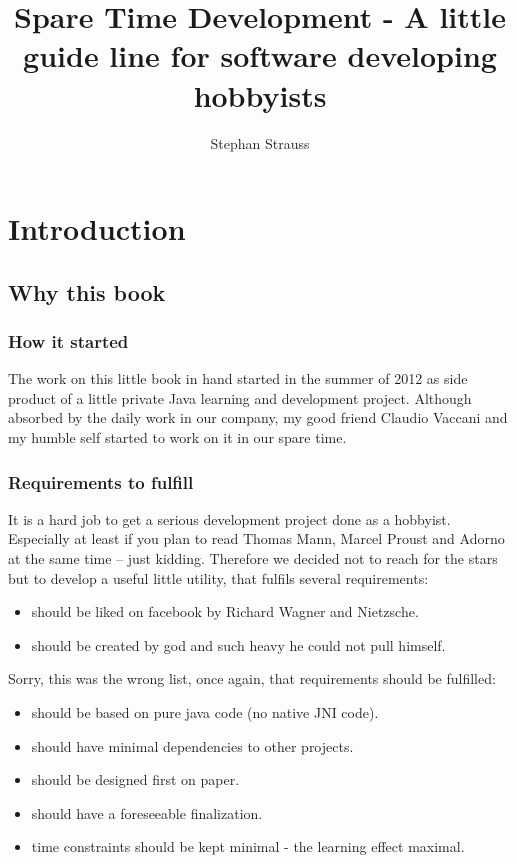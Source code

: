 \documentclass[a4paper]{book}
\author{Stephan Strauss}
\begin{document}
    \title{Spare Time Development - A little guide line for software developing hobbyists}
    \maketitle
    
\part{Introduction}

\chapter{Why this book}

\section{How it started}


The work on this little book in hand started in the summer of 2012 as side product of a little private Java learning and development project. Although absorbed by the daily work in our company, my good friend Claudio Vaccani and my humble self started to work on it in our spare time. 

\section[Requirements]{Requirements to fulfill}

It is a hard job to get a serious development project done as a hobbyist. Especially at least if you plan to read Thomas Mann, Marcel Proust and Adorno at the same time -- just kidding. Therefore we decided not to reach for the stars but to develop a useful little utility, that fulfils several requirements:


\begin{itemize}
\item should be liked on facebook by Richard Wagner and Nietzsche.
\item should be created by god and such heavy he could not pull himself. 
\end{itemize}
Sorry, this was the wrong list, once again, that requirements should be fulfilled:


\begin{itemize}
\item should be based on pure java code (no native JNI code).
\item should have minimal dependencies to other projects. 
\item should be designed first on paper. 
\item should have a foreseeable finalization.
\item time constraints should be kept minimal - the learning effect maximal. 
\end{itemize}
\end{document}
